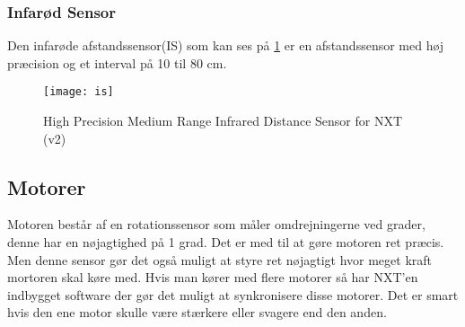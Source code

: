 \subsubsection{Infarød Sensor}
Den infarøde afstandssensor(IS) som kan ses på \ref{is} er en afstandssensor med høj præcision og et interval på 10 til 80 cm.

\begin{figure}[h]
\centering
\texttt{[image: is]} 	
\caption{High Precision Medium Range Infrared Distance Sensor for NXT (v2)}
\label{is}
\end{figure}

\subsection{Motorer}
Motoren består af en rotationssensor som måler omdrejningerne ved grader, denne har en nøjagtighed på 1 grad. Det er med til at gøre motoren ret præcis. Men denne sensor gør det også muligt at styre ret nøjagtigt hvor meget kraft mortoren skal køre med.
Hvis man kører med flere motorer så har NXT'en indbygget software der gør det muligt at synkronisere disse motorer.
Det er smart hvis den ene motor skulle være stærkere eller svagere end den anden.
